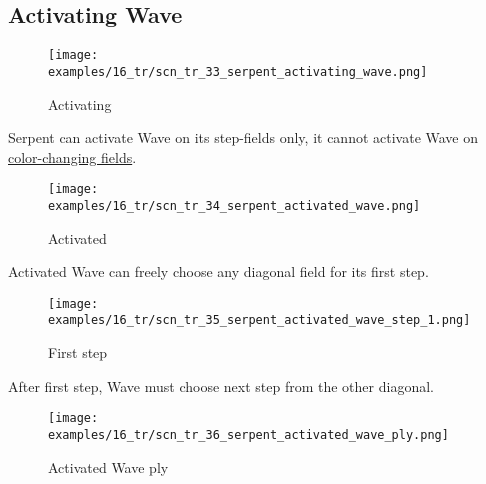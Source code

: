 \subsection*{Activating Wave}
\label{sec:Tamoanchan Revisited/Serpent/Activating Wave}

\vspace*{-0.7\baselineskip}
\noindent
\begin{wrapfigure}[3]{l}{0.4\textwidth}
\centering
\texttt{[image: examples/16\_tr/scn\_tr\_33\_serpent\_activating\_wave.png]}
\vspace*{-0.4\baselineskip}
\caption{Activating}
\label{fig:scn_tr_33_serpent_activating_wave}
\end{wrapfigure}
Serpent can activate Wave on its step-fields only, it cannot activate Wave
on \hyperref[fig:scn_tr_17_serpent_neighbors]{color-changing fields}.

\vspace*{7.0\baselineskip}
\noindent
\begin{wrapfigure}[2]{l}{0.4\textwidth}
\centering
\texttt{[image: examples/16\_tr/scn\_tr\_34\_serpent\_activated\_wave.png]}
\vspace*{-0.4\baselineskip}
\caption{Activated}
\label{fig:scn_tr_34_serpent_activated_wave}
\end{wrapfigure}
Activated Wave can freely choose any diagonal field for its first step.

\vspace*{8.0\baselineskip}
\noindent
\begin{wrapfigure}[2]{l}{0.4\textwidth}
\centering
\texttt{[image: examples/16\_tr/scn\_tr\_35\_serpent\_activated\_wave\_step\_1.png]}
\vspace*{-0.4\baselineskip}
\caption{First step}
\label{fig:scn_tr_35_serpent_activated_wave_step_1}
\end{wrapfigure}
After first step, Wave must choose next step from the other diagonal.

\clearpage %

\noindent
\begin{figure}[!h]
\texttt{[image: examples/16\_tr/scn\_tr\_36\_serpent\_activated\_wave\_ply.png]}
\caption{Activated Wave ply}
\label{fig:scn_tr_36_serpent_activated_wave_ply}
\end{figure}

